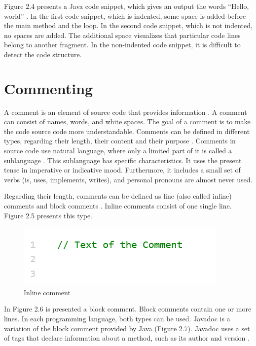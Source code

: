 Figure 2.4 presents a Java code snippet, which gives an output the words “Hello, world”  \cite{hanenberg2024indentation}.
In the first code snippet, which is indented, some space is added before the main method and the loop.  In the second code snippet, which is not indented, no spaces are added. The additional space visualizes that particular code lines belong to another fragment. In the non-indented code snippet, it is difficult to detect the code structure. 
 





\section{Commenting}
A comment is an element of source code that provides information \cite{de2011comment}. A comment can consist of names, words, and white spaces.  The goal of a comment is to make the code source code more understandable.  Comments can be defined in different types, regarding their length, their content and their purpose \cite{de2011comment} \cite{de2017investigating}. Comments in source code use natural language, where only a limited part of it is called a sublanguage \cite{de2017investigating}. This sublanguage has specific characteristics. It uses the present tense in imperative or indicative mood. Furthermore, it includes a small set of verbs (is, uses, implements, writes), and personal pronouns are almost never used.

Regarding their length, comments can be defined as line (also called inline) comments and block comments \cite{de2017investigating}. Inline comments consist of one single line. Figure 2.5 presents this type. 

\begin{figure} [H]
  \centering
  \includegraphics [scale=1]
  {figures/inline.png}
  \caption{Inline comment 
  \cite{de2011comment}}
  \label{fig:AnhangsChor}
\end{figure}

In Figure 2.6 is presented a block comment.  Block comments contain one or more lines. In each programming language, both types can be used. Javadoc is a variation of the block comment provided by Java (Figure 2.7).  Javadoc uses a set of tags that declare information about a method, such as its author and version \cite{de2011comment}.

